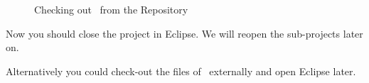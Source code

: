 \begin{figure}[htp]
  \hbox{}\hfill
  \hfill
  \caption{Checking out \ExTeX\ from the Repository}
\end{figure}

Now you should close the project in Eclipse. We will reopen the
sub-projects later on.

Alternatively you could check-out the files of \ExTeX\ externally and
open Eclipse later.


